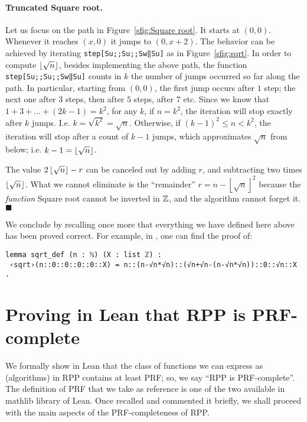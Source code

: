 \documentclass[runningheads]{llncs}
\newcommand*{\qeda}{\hfill\ensuremath{\blacksquare}}%
\newcommand{\RPP}{\textsf{RPP}\xspace}
\newcommand{\PRF}{\textsf{PRF}\xspace}
\newcommand{\MATHLIB}{\textsf{mathlib}\xspace}
\newcommand{\LEAN}{\textsf{Lean}\xspace}
\begin{document}
\paragraph{Truncated Square root.}
Let us focus on the path in Figure~\ref{sfig:Square root}.
It starts at $(0,0)$. Whenever it reaches $(x,0)$ it jumps to $(0,x+2)$.
The behavior can be achieved by iterating \lstinline|step[Su;;Su;;Sw‖Su]| as in Figure~\ref{sfig:sqrt}.
In order to compute $ \left\lfloor \sqrt{n} \right\rfloor $, besides implementing the above path, the function \lstinline|step[Su;;Su;;Sw‖Su]| counts in $ k $ the number of jumps occurred so far along the path. In particular, starting from $ (0,0) $, the first jump occurs after $1$ step; the next one after $3$ steps, then after $5$ steps, after $7$ etc. Since we know that $1 + 3 + \dots + (2k - 1) = k^2$, for any $k$, if $ n = k^2 $, the iteration will stop exactly after $ k $ jumps. I.e. $ k = \sqrt{k^2} = \sqrt{n}$. Otherwise, if $ (k-1)^2 \leq n < k^2 $, the iteration will stop after a count of $ k-1 $ jumps, which approximates $ \sqrt{n} $ from below; i.e. $ k-1 = \left\lfloor \sqrt{n} \right\rfloor $.

\begin{remark}
The value $2 \left\lfloor \sqrt{n} \right\rfloor - r$ can be canceled out by adding $r$, and subtracting two times $\left\lfloor \sqrt{n} \right\rfloor$.
What we cannot eliminate is the ``remainder'' $r = n - \left\lfloor \sqrt{n} \right\rfloor^2$ because the \emph{function} Square root
cannot be inverted in $ \mathbb{Z} $, and the algorithm cannot forget it.
\qeda
\end{remark}

We conclude by recalling once more that everything we have defined here above has been proved correct. For example, in \cite{MalettoRPPLEAN2021}, one can find the proof of:
\begin{lstlisting}
lemma sqrt_def (n : ℕ) (X : list ℤ) :
 ‹sqrt›(n::0::0::0::0::X) = n::(n-√n*√n)::(√n+√n-(n-√n*√n))::0::√n::X .
\end{lstlisting}

\section{Proving in \LEAN that \RPP is \PRF-complete}
\label{section:The UPRF-completeness of RPP}
We formally show in \LEAN that the class of functions we can express as (algorithms) in \RPP contains at least \PRF; so, we say ``\RPP is \PRF-complete''. The definition of \PRF that we take as reference is one of the two available in \MATHLIB library of \LEAN. Once recalled and commented it briefly, we shall proceed with the main aspects of the \PRF-completeness of \RPP.
\end{document}
